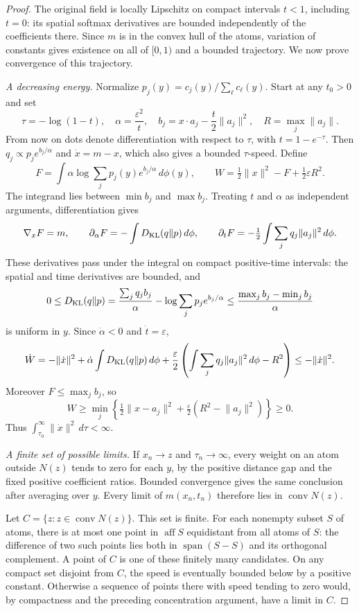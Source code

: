 \documentclass[11pt]{article}
\newcommand{\eps}{\varepsilon}
\begin{document}
\begin{proof}
The original field is locally Lipschitz on compact intervals $t<1$, including
$t=0$: its spatial softmax derivatives are bounded independently of the
coefficients there. Since $m$ is in the convex hull of the atoms,
variation of constants gives existence on all of $[0,1)$ and a bounded trajectory.
We now prove convergence of this trajectory.

\emph{A decreasing energy.}
Normalize $p_j(y)=c_j(y)/\sum_\ell c_\ell(y)$. Start at any $t_0>0$ and set
\[
\tau=-\log(1-t),\quad \alpha=\frac{\eps^2}{t},\quad
b_j=x\cdot a_j-\frac t2\lVert a_j\rVert^2,\quad R=\max_j\lVert a_j\rVert.
\]
From now on dots denote differentiation with respect to $\tau$, with
$t=1-e^{-\tau}$. Then $q_j\propto p_je^{b_j/\alpha}$ and $\dot x=m-x$,
which also gives a bounded $\tau$-speed. Define
\[
F=\int\alpha\log\sum_jp_j(y)e^{b_j/\alpha}\,d\phi(y),\qquad
W=\tfrac12\lVert x\rVert^2-F+\tfrac12\eps R^2.
\]
The integrand lies between $\min b_j$ and $\max b_j$. Treating $t$ and $\alpha$
as independent arguments, differentiation gives
\[
\nabla_xF=m,\qquad \partial_\alpha F=-\int D_{\rm KL}(q\Vert p)\,d\phi,
\qquad \partial_tF=-\tfrac12\int\sum_jq_j\lVert a_j\rVert^2\,d\phi.
\]
These derivatives pass under the integral on compact positive-time intervals:
the spatial and time derivatives are bounded, and
\[
0\le D_{\rm KL}(q\Vert p)
=\frac{\sum_jq_jb_j}{\alpha}-\log\sum_jp_je^{b_j/\alpha}
\le\frac{\max_jb_j-\min_jb_j}{\alpha}
\]
is uniform in $y$. Since $\dot\alpha<0$ and $\dot t=\eps$,
\[
\dot W=-\lVert\dot x\rVert^2+\dot\alpha\int D_{\rm KL}(q\Vert p)\,d\phi
+\frac\eps2\left(\int\sum_jq_j\lVert a_j\rVert^2\,d\phi-R^2\right)
\le-\lVert\dot x\rVert^2.
\]
Moreover $F\le\max_jb_j$, so
\[
W\ge\min_j\left\{\tfrac12\lVert x-a_j\rVert^2
+\tfrac\eps2(R^2-\lVert a_j\rVert^2)\right\}\ge0.
\]
Thus $\int_{\tau_0}^\infty\lVert\dot x\rVert^2\,d\tau<\infty$.

\emph{A finite set of possible limits.}
If $x_n\to z$ and $\tau_n\to\infty$, every weight on an atom outside $N(z)$
tends to zero for each $y$, by the positive distance gap and the fixed positive
coefficient ratios. Bounded convergence gives the same conclusion after
averaging over $y$. Every limit of $m(x_n,t_n)$ therefore lies in
$\operatorname{conv}N(z)$.

Let $C=\{z:z\in\operatorname{conv}N(z)\}$. This set is finite. For each
nonempty subset $S$ of atoms, there is at most one point in
$\operatorname{aff}S$ equidistant from all atoms of $S$: the difference of two
such points lies both in $\operatorname{span}(S-S)$ and its orthogonal
complement. A point of $C$ is one of these finitely many candidates.
On any compact set disjoint from $C$, the speed is eventually bounded below
by a positive constant. Otherwise a sequence of points there with speed tending
to zero would, by compactness and the preceding concentration argument, have
a limit in $C$.


\end{proof}
\end{document}
